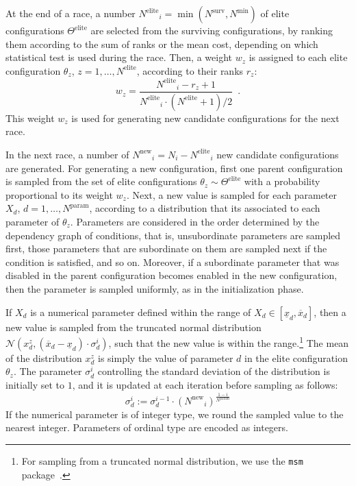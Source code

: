 \documentclass[a4paper]{article}
\newcommand{\assign}{\ensuremath{:=}}
\newcommand{\iter}{\ensuremath{i}\xspace}
\newcommand{\Ncand}[1][]{\ensuremath{N_{#1}}\xspace}
\newcommand{\Nparam}{\ensuremath{{N^\text{param}}}\xspace}
\newcommand{\Nmin}{\ensuremath{N^\text{min}}\xspace}
\newcommand{\Nsurv}{\ensuremath{N^\text{surv}}\xspace}
\newcommand{\Nelite}{\ensuremath{N^\text{elite}}\xspace}
\newcommand{\Nnew}{\ensuremath{N^\text{new}}\xspace}
\newcommand{\Celite}{\ensuremath{\Theta^\text{elite}}\xspace}
\begin{document}
At the end of a race, a number $\Nelite_i = \min(\Nsurv, \Nmin)$ of
elite configurations $\Celite$ are selected from the
surviving configurations, by ranking them according to the sum of
ranks or the mean cost, depending on which statistical test is used
during the race. Then, a weight $w_z$ is assigned to each elite
configuration $\theta_z$, $z=1,\dotsc, \Nelite$, according to their
ranks $r_z$:
%
\begin{equation}\label{eq:weight}
  w_z = \frac{\Nelite_i - r_z + 1}{\Nelite_i \cdot (\Nelite + 1) /2}\enspace.
\end{equation}
%
This weight $w_z$ is used for generating new candidate configurations
for the next race. 

In the next race, a number of $\Nnew_i = \Ncand[\iter] - \Nelite_i$ new
candidate configurations are generated. For generating a new
configuration, first one parent configuration is
sampled from the set of elite configurations $\theta_z\sim\Celite$
with a probability proportional to its weight $w_z$. Next, a new value
is sampled for each parameter $X_d$, $d=1,\dotsc,\Nparam$, according
to a distribution that its associated to each parameter of
$\theta_z$. Parameters are considered in the order determined by the
dependency graph of conditions, that is, unsubordinate parameters are
sampled first, those parameters that are subordinate on them are
sampled next if the condition is satisfied, and so on. Moreover, if a subordinate parameter that was disabled in the
parent configuration becomes enabled in the new configuration, then
the parameter is sampled uniformly, as in the initialization phase.

If $X_d$ is a numerical parameter defined within the range of $X_d \in
[\underline{x}_d, \overline{x}_d]$, then a new value is sampled from
the truncated normal distribution $\mathcal{N}(x_d^z, (\overline{x}_d - \underline{x}_d)\cdot\sigma_d^i)$,
such that the new value is within the range.\footnote{%
  For sampling from a truncated normal distribution, we use the
  \texttt{msm} package~\citep{Jac2011jss}.} The mean of the
distribution $x_d^z$ is simply the value of parameter $d$ in the elite
configuration $\theta_z$. The parameter $\sigma_d^i$ controlling the standard deviation of the distribution is initially set to $1$, and it is updated at each iteration before sampling as follows:
%
\begin{equation}\label{eq:sigma}
  \sigma_d^i \assign  \sigma_d^{i-1} \cdot {(\Nnew_i)}^{\frac{1-i}{\Nparam}}
\end{equation}
%
If the numerical parameter is of integer type, we round the sampled
value to the nearest integer. Parameters of ordinal type are
encoded as integers.
\end{document}
